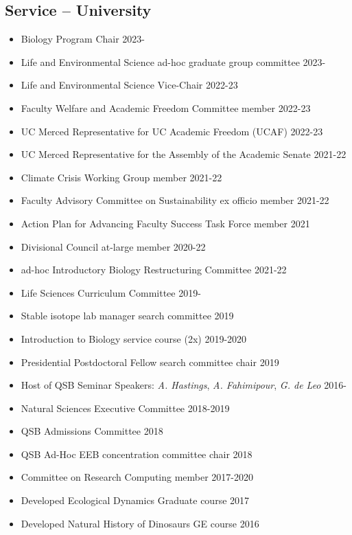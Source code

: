 \documentclass[margin,line,12pt]{res}
\begin{document}
\begin{resume}
\section{\sc Service -- University}
\begin{itemize}
  \item Biology Program Chair \hfill 2023-
  \item Life and Environmental Science ad-hoc graduate group committee \hfill 2023-
  \item Life and Environmental Science Vice-Chair \hfill 2022-23
  \item Faculty Welfare and Academic Freedom Committee member \hfill 2022-23
  \item UC Merced Representative for UC Academic Freedom (UCAF) \hfill 2022-23
  \item UC Merced Representative for the Assembly of the Academic Senate \hfill 2021-22
  \item Climate Crisis Working Group member \hfill 2021-22
  \item Faculty Advisory Committee on Sustainability ex officio member \hfill 2021-22
  \item Action Plan for Advancing Faculty Success Task Force member \hfill 2021
  \item Divisional Council at-large member \hfill 2020-22
  \item ad-hoc Introductory Biology Restructuring Committee \hfill 2021-22
	\item Life Sciences Curriculum Committee \hfill 2019-
	\item Stable isotope lab manager search committee \hfill 2019
	\item Introduction to Biology service course (2x) \hfill 2019-2020
	\item Presidential Postdoctoral Fellow search committee chair \hfill 2019
  \item Host of QSB Seminar Speakers: \emph{A. Hastings}, \emph{A. Fahimipour}, \emph{G. de Leo} \hfill 2016-
	\item Natural Sciences Executive Committee \hfill 2018-2019
	\item QSB Admissions Committee \hfill 2018
	\item QSB Ad-Hoc EEB concentration committee chair \hfill 2018
	\item Committee on Research Computing member \hfill 2017-2020
	\item Developed Ecological Dynamics Graduate course \hfill 2017
	\item Developed Natural History of Dinosaurs GE course \hfill 2016


\end{itemize}
\end{resume}
\end{document}
